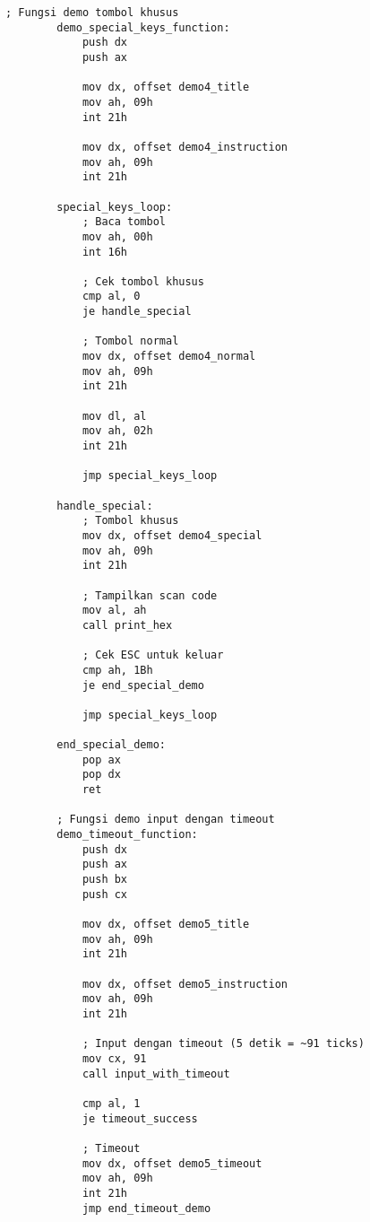 \documentclass[../main.tex]{subfiles}
\begin{document}
\begin{lstlisting}[language={[x86masm]Assembler}, caption=Program Lengkap - Keyboard Input Demo, label={lst:complete-demo}]
        ; Fungsi demo tombol khusus
        demo_special_keys_function:
            push dx
            push ax
            
            mov dx, offset demo4_title
            mov ah, 09h
            int 21h
            
            mov dx, offset demo4_instruction
            mov ah, 09h
            int 21h
            
        special_keys_loop:
            ; Baca tombol
            mov ah, 00h
            int 16h
            
            ; Cek tombol khusus
            cmp al, 0
            je handle_special
            
            ; Tombol normal
            mov dx, offset demo4_normal
            mov ah, 09h
            int 21h
            
            mov dl, al
            mov ah, 02h
            int 21h
            
            jmp special_keys_loop
            
        handle_special:
            ; Tombol khusus
            mov dx, offset demo4_special
            mov ah, 09h
            int 21h
            
            ; Tampilkan scan code
            mov al, ah
            call print_hex
            
            ; Cek ESC untuk keluar
            cmp ah, 1Bh
            je end_special_demo
            
            jmp special_keys_loop
            
        end_special_demo:
            pop ax
            pop dx
            ret
        
        ; Fungsi demo input dengan timeout
        demo_timeout_function:
            push dx
            push ax
            push bx
            push cx
            
            mov dx, offset demo5_title
            mov ah, 09h
            int 21h
            
            mov dx, offset demo5_instruction
            mov ah, 09h
            int 21h
            
            ; Input dengan timeout (5 detik = ~91 ticks)
            mov cx, 91
            call input_with_timeout
            
            cmp al, 1
            je timeout_success
            
            ; Timeout
            mov dx, offset demo5_timeout
            mov ah, 09h
            int 21h
            jmp end_timeout_demo
            

\end{lstlisting}
\end{document}
